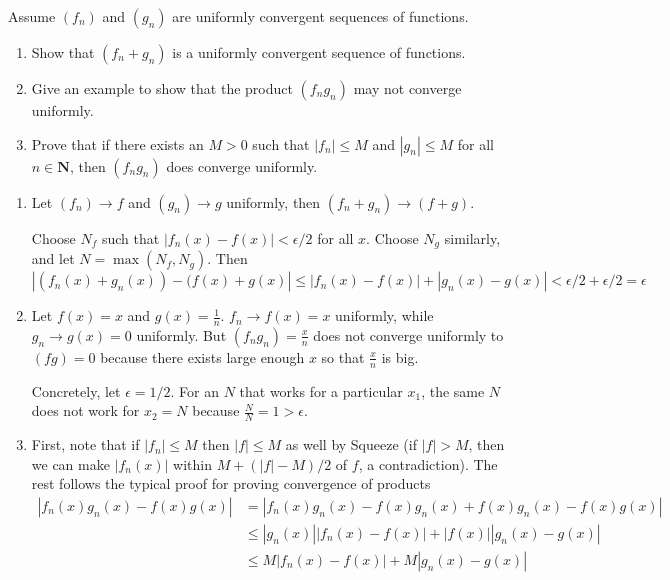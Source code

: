\documentclass{oxmathproblems}
\begin{document}
\begin{questions}
\miquestion Assume $(f_{n})$ and $(g_{n})$ are uniformly convergent sequences of functions.
\begin{enumerate}[label=(\alph*)]
  \item Show that $(f_{n}+g_{n})$ is a uniformly convergent sequence of functions.
  \item Give an example to show that the product $(f_{n}g_{n})$ may not converge uniformly.
  \item Prove that if there exists an $M > 0$ such that $|f_{n}| \leq M$ and $|g_{n}|\leq M$ for all $n \in \textbf{N}$, then $(f_{n}g_{n})$ does converge uniformly.
\end{enumerate}

\begin{solution}
  \begin{enumerate}[label=(\alph*)]
    \item Let $(f_{n}) \to f$ and $(g_{n}) \to g$ uniformly, then $(f_{n}+g_{n}) \to (f+g)$.
    
    Choose $N_{f}$ such that $|f_{n}(x)-f(x)| < \epsilon/2$ for all $x$. Choose $N_{g}$ similarly, and let $N=\max(N_{f}, N_{g})$. Then
    \[|(f_{n}(x)+g_{n}(x))-(f(x)+g(x)| \leq |f_{n}(x)-f(x)| + |g_{n}(x)-g(x)| < \epsilon/2 + \epsilon/2 = \epsilon\]
    
    \item Let $f(x)=x$ and $g(x)=\frac{1}{n}$. $f_{n} \to f(x)=x$ uniformly, while $g_{n} \to g(x)=0$ uniformly.
    But $(f_{n}g_{n})=\frac{x}{n}$ does not converge uniformly to $(fg)=0$ because there exists large enough $x$ so that $\frac{x}{n}$ is big.

    Concretely, let $\epsilon=1/2$. For an $N$ that works for a particular $x_{1}$, the same $N$ does not work for $x_{2}=N$ because $\frac{N}{N}=1>\epsilon$.

    \item First, note that if $|f_{n}| \leq M$ then $|f| \leq M$ as well by Squeeze (if $|f| > M$, then we can make $|f_{n}(x)|$ within $M+(|f|-M)/2$ of $f$, a contradiction).
    The rest follows the typical proof for proving convergence of products
    \begin{align*}
      |f_{n}(x)g_{n}(x) - f(x)g(x)| &= |f_{n}(x)g_{n}(x)-f(x)g_{n}(x)+f(x)g_{n}(x)-f(x)g(x)|\\
      &\leq |g_{n}(x)||f_{n}(x)-f(x)|+|f(x)||g_{n}(x)-g(x)|\\
      &\leq M|f_{n}(x)-f(x)| + M|g_{n}(x)-g(x)|
    \end{align*}
    

\end{enumerate}
\end{solution}
\end{questions}
\end{document}
